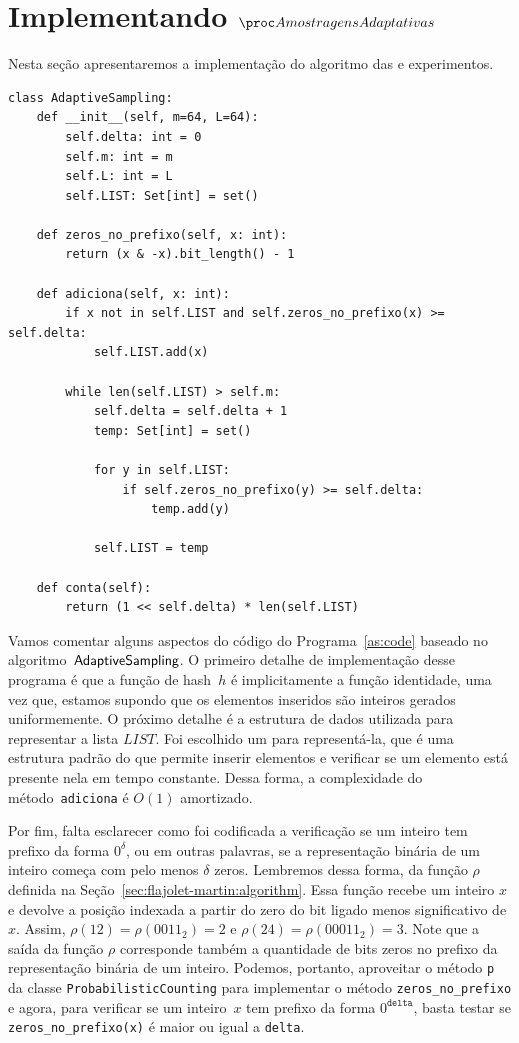 \newpage
\section{Implementando $\asampling$}

Nesta seção apresentaremos a implementação do algoritmo das   e experimentos.

\begin{lstlisting}[style=mypython,caption=Implementação do algoritmo $\AS$,captionpos=b, label=as:code]
class AdaptiveSampling:
    def __init__(self, m=64, L=64):
        self.delta: int = 0
        self.m: int = m
        self.L: int = L
        self.LIST: Set[int] = set()
   
    def zeros_no_prefixo(self, x: int):
        return (x & -x).bit_length() - 1

    def adiciona(self, x: int):
        if x not in self.LIST and self.zeros_no_prefixo(x) >= self.delta:
            self.LIST.add(x)

        while len(self.LIST) > self.m:
            self.delta = self.delta + 1
            temp: Set[int] = set()

            for y in self.LIST:
                if self.zeros_no_prefixo(y) >= self.delta:
                    temp.add(y)

            self.LIST = temp

    def conta(self):
        return (1 << self.delta) * len(self.LIST)
\end{lstlisting}

Vamos comentar alguns aspectos do código do Programa~\ref{as:code} baseado no algoritmo~$\textsf{AdaptiveSampling}$. O primeiro detalhe de 
implementação desse programa é que a função de hash~$h$ é implicitamente a função identidade, uma vez que, estamos 
supondo que os elementos inseridos são inteiros gerados uniformemente. O próximo detalhe é a estrutura de dados 
utilizada para representar a lista $LIST$. Foi escolhido um  para representá-la, que é uma estrutura padrão do 
 que permite inserir elementos e verificar se um elemento está presente nela em tempo constante. Dessa 
forma, a complexidade do método~\texttt{adiciona} é $O(1)$ amortizado.

Por fim, falta esclarecer como foi codificada a verificação se um inteiro tem prefixo da forma $0^{\delta}$, ou em 
outras palavras, se a representação binária de um inteiro começa com pelo menos $\delta$ zeros. Lembremos dessa forma, 
da função $\rho$ definida na Seção~\ref{sec:flajolet-martin:algorithm}. Essa função recebe um inteiro $x$ e devolve a 
posição indexada a partir do zero do bit ligado menos significativo de $x$. Assim, $\rho(12) = \rho(0011_2) = 2$ e 
$\rho(24) = \rho(00011_2) = 3$. Note que a saída da função $\rho$ corresponde também a quantidade de bits zeros no 
prefixo da representação binária de um inteiro. Podemos, portanto, aproveitar o método \texttt{p} da classe 
\texttt{ProbabilisticCounting} para implementar o método \texttt{zeros\_no\_prefixo} e agora, para verificar se um 
inteiro~$x$ tem prefixo da forma $0^{\texttt{delta}}$, basta testar se \texttt{zeros\_no\_prefixo(x)} é maior ou igual a
\texttt{delta}.

